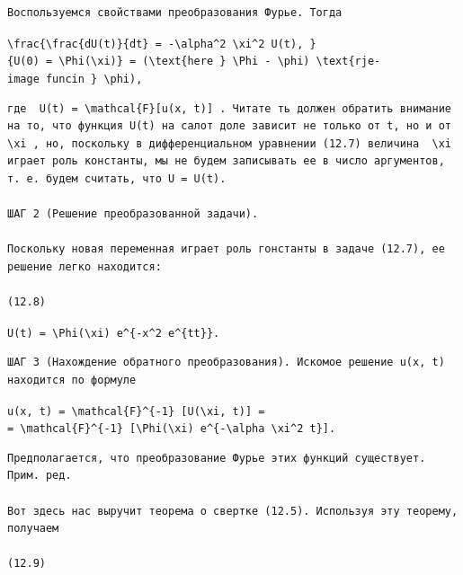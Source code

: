 \documentclass[
  ukrainian,
]{article}
\begin{document}
\begin{verbatim}
Воспользуемся свойствами преобразования Фурье. Тогда
\end{verbatim}

\texttt{\textbackslash{}frac\{\textbackslash{}frac\{dU(t)\}\{dt\}\ =\ -\textbackslash{}alpha\^{}2\ \textbackslash{}xi\^{}2\ U(t),\ \}\{U(0)\ =\ \textbackslash{}Phi(\textbackslash{}xi)\}\ =\ (\textbackslash{}text\{here\ \}\ \textbackslash{}Phi\ -\ \textbackslash{}phi)\ \textbackslash{}text\{rje-image\ funcin\ \}\ \textbackslash{}phi),}

\begin{verbatim}
где  U(t) = \mathcal{F}[u(x, t)] . Читате ть должен обратить внимание на то, что функция U(t) на салот доле зависит не только от t, но и от  \xi , но, поскольку в дифференциальном уравнении (12.7) величина  \xi  играет роль константы, мы не будем записывать ее в число аргументов, т. е. будем считать, что U = U(t).

ШАГ 2 (Решение преобразованной задачи).

Поскольку новая переменная играет роль гонстанты в задаче (12.7), ее решение легко находится:

(12.8)
\end{verbatim}

\texttt{U(t)\ =\ \textbackslash{}Phi(\textbackslash{}xi)\ e\^{}\{-x\^{}2\ e\^{}\{tt\}\}.}

\begin{verbatim}
ШАГ 3 (Нахождение обратного преобразования). Искомое решение u(x, t) находится по формуле
\end{verbatim}

\texttt{u(x,\ t)\ =\ \textbackslash{}mathcal\{F\}\^{}\{-1\}\ {[}U(\textbackslash{}xi,\ t){]}\ =}
\texttt{=\ \textbackslash{}mathcal\{F\}\^{}\{-1\}\ {[}\textbackslash{}Phi(\textbackslash{}xi)\ e\^{}\{-\textbackslash{}alpha\ \textbackslash{}xi\^{}2\ t\}{]}.}

\begin{verbatim}
Предполагается, что преобразование Фурье этих функций существует. Прим. ред.

Вот здесь нас выручит теорема о свертке (12.5). Используя эту теорему, получаем

(12.9)
\end{verbatim}
\end{document}
